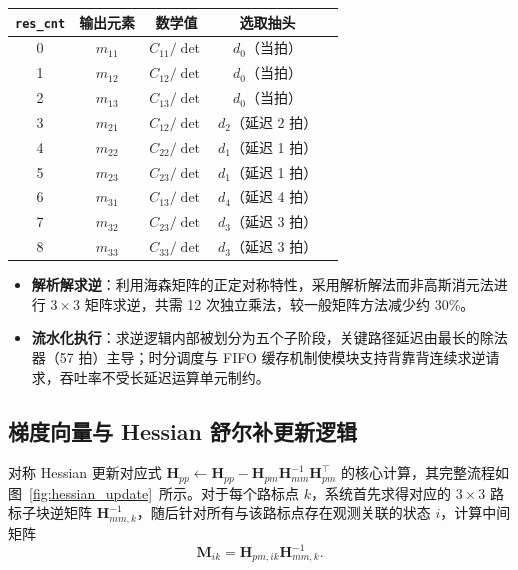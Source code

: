 \begin{table}[htbp]
\centering
{}
\label{tab:inv_output}
\begin{tabular}{ccccc}
\toprule
\textbf{\texttt{res\_cnt}} & \textbf{输出元素} & \textbf{数学值} & \textbf{选取抽头} \\
\midrule
0 & $m_{11}$ & $C_{11}/\det$ & $d_0$（当拍） \\
1 & $m_{12}$ & $C_{12}/\det$ & $d_0$（当拍） \\
2 & $m_{13}$ & $C_{13}/\det$ & $d_0$（当拍） \\
3 & $m_{21}$ & $C_{12}/\det$ & $d_2$（延迟 2 拍）\\
4 & $m_{22}$ & $C_{22}/\det$ & $d_1$（延迟 1 拍）\\
5 & $m_{23}$ & $C_{23}/\det$ & $d_1$（延迟 1 拍）\\
6 & $m_{31}$ & $C_{13}/\det$ & $d_4$（延迟 4 拍）\\
7 & $m_{32}$ & $C_{23}/\det$ & $d_3$（延迟 3 拍）\\
8 & $m_{33}$ & $C_{33}/\det$ & $d_3$（延迟 3 拍）\\
\bottomrule
\end{tabular}
\end{table}

\begin{itemize}
    \item \textbf{解析解求逆}：利用海森矩阵的正定对称特性，采用解析解法而非高斯消元法进行 $3 \times 3$ 矩阵求逆，共需 12 次独立乘法，较一般矩阵方法减少约 30\%。
    \item \textbf{流水化执行}：求逆逻辑内部被划分为五个子阶段，关键路径延迟由最长的除法器（57 拍）主导；时分调度与 FIFO 缓存机制使模块支持背靠背连续求逆请求，吞吐率不受长延迟运算单元制约。
\end{itemize}

\subsection{梯度向量与 Hessian 舒尔补更新逻辑}

对称 Hessian 更新对应式 $\mathbf{H}_{pp} \leftarrow \mathbf{H}_{pp} - \mathbf{H}_{pm}\mathbf{H}_{mm}^{-1}\mathbf{H}_{pm}^{\top}$ 的核心计算，其完整流程如图~\ref{fig:hessian_update}~所示。对于每个路标点 $k$，系统首先求得对应的 $3\times3$ 路标子块逆矩阵 $\mathbf{H}_{mm,k}^{-1}$，随后针对所有与该路标点存在观测关联的状态 $i$，计算中间矩阵
\begin{equation}
\mathbf{M}_{ik}=\mathbf{H}_{pm,ik}\mathbf{H}_{mm,k}^{-1}.
\end{equation}

